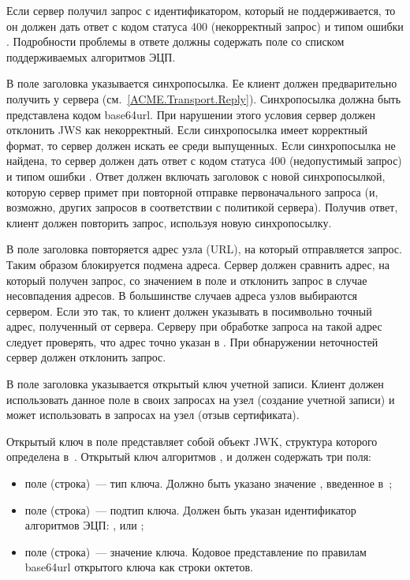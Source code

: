 Если сервер получил запрос с идентификатором, который не поддерживается,
то он должен дать ответ с кодом статуса 400 (некорректный запрос) и 
типом ошибки .
%
Подробности проблемы в ответе должны содержать поле  со 
списком поддерживаемых алгоритмов ЭЦП.

В поле  заголовка указывается синхропосылка. Ее клиент должен 
предварительно получить у сервера (см.~\ref{ACME.Transport.Reply}).
%
Синхропосылка должна быть представлена кодом base64url. При нарушении этого 
условия сервер должен отклонить JWS как некорректный. 
%
Если синхропосылка  имеет корректный формат, то сервер должен 
искать ее среди выпущенных.
%
Если синхропосылка не найдена, то сервер должен дать ответ с кодом статуса 400 
(недопустимый запрос) и типом ошибки .
%
Ответ должен включать заголовок  с новой синхропосылкой, 
которую сервер примет при повторной отправке первоначального запроса (и, 
возможно, других запросов в соответствии с политикой сервера). Получив ответ, 
клиент должен повторить запрос, используя новую синхропосылку. 

В поле  заголовка повторяется адрес узла (URL), на который 
отправляется запрос. Таким образом блокируется подмена адреса.
%
Сервер должен сравнить адрес, на который получен запрос, со значением
в поле  и отклонить запрос в случае несовпадения адресов. 
%
В большинстве случаев адреса узлов выбираются сервером. Если это так, то 
клиент должен указывать в  посимвольно точный адрес, полученный от 
сервера. 
%
Серверу при обработке запроса на такой адрес следует проверять, что адрес точно 
указан в . При обнаружении неточностей сервер должен отклонить запрос.

В поле  заголовка указывается открытый ключ учетной записи. Клиент 
должен использовать данное поле в своих запросах на узел  
(создание учетной записи) и может использовать в запросах на узел 
 (отзыв сертификата).

Открытый ключ в поле  представляет собой объект JWK, структура 
которого определена в~\cite{RFC7517}. 
%
Открытый ключ алгоритмов ,  
и  должен содержать три поля:
\begin{itemize}
\item
поле  (строка)~--- тип ключа. Должно быть указано значение 
, введенное в~\cite{RFC8037};
%

\item
поле  (строка)~--- подтип ключа. Должен быть указан идентификатор 
алгоритмов ЭЦП: ,  или ;

\item
поле  (строка)~--- значение ключа. Кодовое представление 
по правилам base64url открытого ключа как строки октетов.
\end{itemize}

